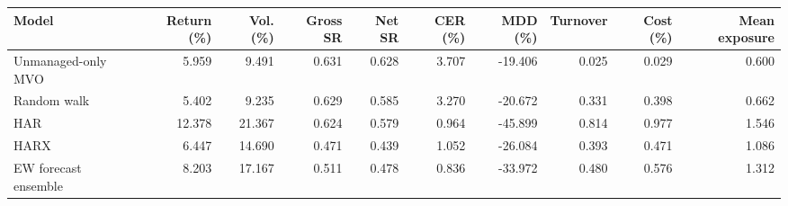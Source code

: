 \begin{landscape}
\begin{table}[p]
{\begin{tabular}{lrrrrrrrrr}
\hline
Model & Return (\%) & Vol. (\%) & Gross SR & Net SR & CER (\%) & MDD (\%) & Turnover & Cost (\%) & Mean exposure \\
\hline
Unmanaged-only MVO & 5.959 & 9.491 & 0.631 & 0.628 & 3.707 & -19.406 & 0.025 & 0.029 & 0.600 \\
Random walk & 5.402 & 9.235 & 0.629 & 0.585 & 3.270 & -20.672 & 0.331 & 0.398 & 0.662 \\
HAR & 12.378 & 21.367 & 0.624 & 0.579 & 0.964 & -45.899 & 0.814 & 0.977 & 1.546 \\
HARX & 6.447 & 14.690 & 0.471 & 0.439 & 1.052 & -26.084 & 0.393 & 0.471 & 1.086 \\
EW forecast ensemble & 8.203 & 17.167 & 0.511 & 0.478 & 0.836 & -33.972 & 0.480 & 0.576 & 1.312 \\
\hline
\end{tabular}}
\end{table}
\end{landscape}
